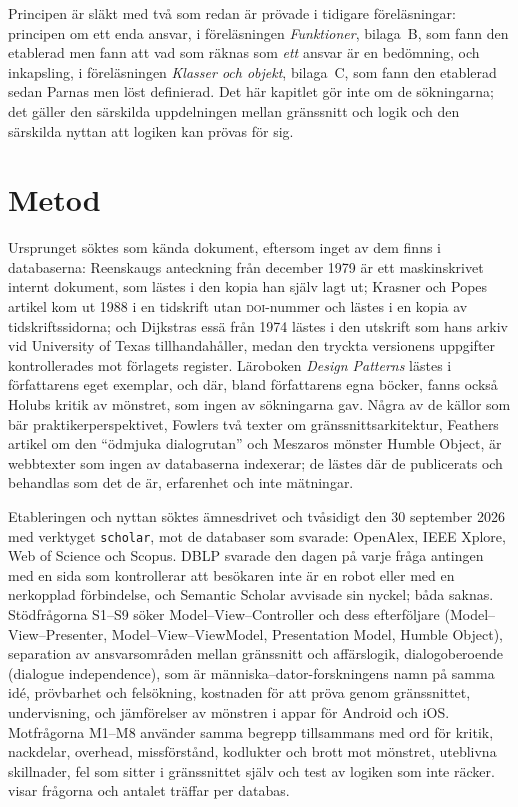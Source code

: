 Principen är släkt med två som redan är prövade i tidigare
föreläsningar: principen om ett enda ansvar, i föreläsningen
\emph{Funktioner}, bilaga~B, som fann den etablerad men fann att vad som
räknas som \emph{ett} ansvar är en bedömning, och inkapsling, i
föreläsningen \emph{Klasser och objekt}, bilaga~C, som fann den
etablerad sedan Parnas men löst definierad.  Det här kapitlet gör inte
om de sökningarna; det gäller den särskilda uppdelningen mellan
gränssnitt och logik och den särskilda nyttan att logiken kan prövas
för sig.

\section{Metod}
\label{sec:sep-metod-grafik}

Ursprunget söktes som kända dokument, eftersom inget av dem finns i
databaserna: Reenskaugs anteckning från december 1979 är ett
maskinskrivet internt dokument, som lästes i den kopia han själv lagt
ut; Krasner och Popes artikel kom ut 1988 i en tidskrift utan
\textsc{doi}-nummer och lästes i en kopia av tidskriftssidorna; och
Dijkstras essä från 1974 lästes i den utskrift som hans arkiv vid
University of Texas tillhandahåller, medan den tryckta versionens
uppgifter kontrollerades mot förlagets register.  Läroboken
\emph{Design Patterns}\autocite{Gamma1994DesignPatterns} lästes i
författarens eget exemplar, och där, bland författarens egna böcker,
fanns också Holubs kritik av mönstret\autocite{Holub2004}, som ingen
av sökningarna gav.  Några av de källor som bär
praktikerperspektivet, Fowlers två texter om gränssnittsarkitektur,
Feathers artikel om den \enquote{ödmjuka dialogrutan} och Meszaros
mönster \foreignlanguage{english}{Humble Object}, är webbtexter som
ingen av databaserna indexerar; de lästes där de publicerats och
behandlas som det de är, erfarenhet och inte mätningar.

Etableringen och nyttan söktes ämnesdrivet och tvåsidigt den 30
september 2026 med verktyget \texttt{scholar}, mot de databaser som
svarade: OpenAlex, IEEE Xplore, Web of Science och Scopus.  DBLP
svarade den dagen på varje fråga antingen med en sida som kontrollerar
att besökaren inte är en robot eller med en nerkopplad förbindelse, och
Semantic Scholar avvisade sin nyckel; båda saknas.  Stödfrågorna
S1--S9 söker Model--View--Controller och dess efterföljare
(Model--View--Presenter, Model--View--ViewModel, \foreignlanguage{english}{%
Presentation Model}, \foreignlanguage{english}{Humble Object}),
separation av ansvarsområden mellan gränssnitt och affärslogik,
dialogoberoende (\foreignlanguage{english}{dialogue independence}), som
är människa--dator-forskningens namn på samma idé, prövbarhet och
felsökning, kostnaden för att pröva genom gränssnittet, undervisning,
och jämförelser av mönstren i appar för Android och iOS.  Motfrågorna
M1--M8 använder samma begrepp tillsammans med ord för kritik,
nackdelar, overhead, missförstånd, kodlukter och brott mot mönstret,
uteblivna skillnader, fel som sitter i gränssnittet själv och test av
logiken som inte räcker.   visar
frågorna och antalet träffar per databas.


